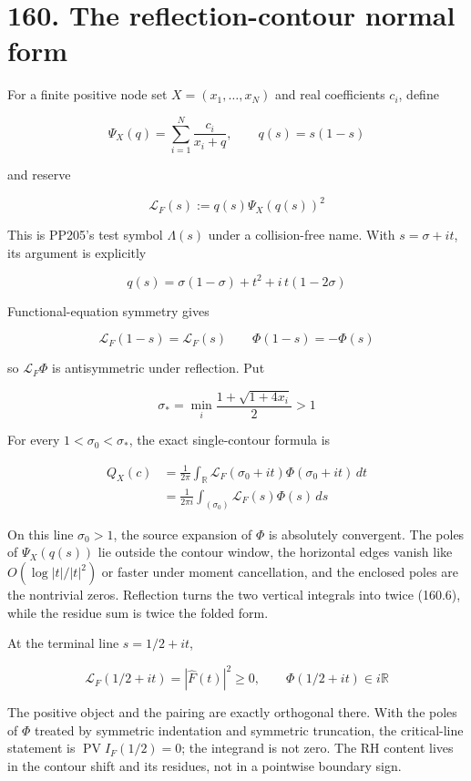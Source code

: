 \documentclass[
  11pt,
]{book}
\begin{document}
\section{160. The reflection-contour normal
form}\label{the-reflection-contour-normal-form}

For a finite positive node set \(X=(x_1,\ldots,x_N)\) and real
coefficients \(c_i\), define

\[
\Psi_X(q)=\sum_{i=1}^N\frac{c_i}{x_i+q},\qquad
q(s)=s(1-s)
\tag{160.1}
\]

and reserve

\[
\boxed{
\mathscr L_F(s)
:=q(s)\Psi_X(q(s))^2}
\tag{160.2}
\]

This is PP205's test symbol \(\Lambda(s)\) under a collision-free name.
With \(s=\sigma+it\), its argument is explicitly

\[
q(s)
=\sigma(1-\sigma)+t^2+i\,t(1-2\sigma)
\tag{160.3}
\]

Functional-equation symmetry gives

\[
\mathscr L_F(1-s)=\mathscr L_F(s)
\qquad
\Phi(1-s)=-\Phi(s)
\tag{160.4}
\]

so \(\mathscr L_F\Phi\) is antisymmetric under reflection. Put

\[
\sigma_*=\min_i\frac{1+\sqrt{1+4x_i}}2>1
\tag{160.5}
\]

For every \(1<\sigma_0<\sigma_*\), the exact single-contour formula is

\[
\boxed{
\begin{aligned}
Q_X(c)
&=\frac1{2\pi}\int_{\mathbb R}
\mathscr L_F(\sigma_0+it)\Phi(\sigma_0+it)\,dt\\
&=\frac1{2\pi i}\int_{(\sigma_0)}
\mathscr L_F(s)\Phi(s)\,ds
\end{aligned}}
\tag{160.6}
\]

On this line \(\sigma_0>1\), the source expansion of \(\Phi\) is
absolutely convergent. The poles of \(\Psi_X(q(s))\) lie outside the
contour window, the horizontal edges vanish like \(O(\log|t|/|t|^2)\) or
faster under moment cancellation, and the enclosed poles are the
nontrivial zeros. Reflection turns the two vertical integrals into twice
(160.6), while the residue sum is twice the folded form.

At the terminal line \(s=1/2+it\),

\[
\boxed{
\mathscr L_F(1/2+it)=|\widehat F(t)|^2\ge0,\qquad
\Phi(1/2+it)\in i\mathbb R}
\tag{160.7}
\]

The positive object and the pairing are exactly orthogonal there. With
the poles of \(\Phi\) treated by symmetric indentation and symmetric
truncation, the critical-line statement is
\(\operatorname{PV}I_F(1/2)=0\); the integrand is not zero. The RH
content lives in the contour shift and its residues, not in a pointwise
boundary sign.
\end{document}
